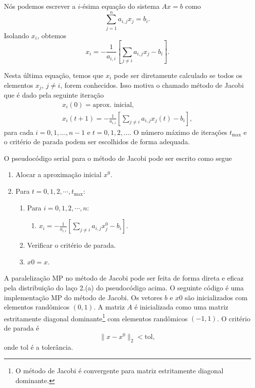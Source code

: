 Nós podemos escrever a $i$-ésima equação do sistema $Ax = b$ como
\begin{equation}
  \sum_{j=1}^n a_{i,j}x_j = b_i.
\end{equation}
Isolando $x_{i}$, obtemos
\begin{equation}\label{eq:mp_iterJacobi}
  x_i = -\frac{1}{a_{i,i}}\left[\sum_{j\neq i}a_{i,j}x_j - b_i\right].
\end{equation}

Nesta última equação, temos que $x_i$ pode ser diretamente calculado se todos os elementos $x_j$, $j\neq i$, forem conhecidos. Isso motiva o chamado método de Jacobi que é dado pela seguinte iteração
\begin{gather}
  x_i(0) = \text{aprox. inicial},\\
  x_i(t+1) = -\frac{1}{a_{i,i}}\left[\sum_{j\neq i}a_{i,j}x_j(t) - b_i\right],\label{eq:mp_jacobi_xi}
\end{gather}
para cada $i=0,1,\dotsc,n-1$ e $t=0,1,2,\ldots$. O número máximo de iterações $t_{\text{max}}$ e o critério de parada podem ser escolhidos de forma adequada.

O pseudocódigo serial para o método de Jacobi pode ser escrito como segue
\begin{enumerate}
\item Alocar a aproximação inicial $x^0$.
\item Para $t=0,1,2,\cdots,t_{\text{max}}$:
  \begin{enumerate}
  \item Para $i=0,1,2,\cdots,n$:
    \begin{enumerate}
    \item $\displaystyle x_i = -\frac{1}{a_{i,i}}\left[\sum_{j\neq i}a_{i,j}x^0_j - b_i\right]$.
    \end{enumerate}
  \item Verificar o critério de parada.
  \item $x0 = x$.
  \end{enumerate}
\end{enumerate}

A paralelização MP no método de Jacobi pode ser feita de forma direta e eficaz pela distribuição do laço 2.(a) do pseudocódigo acima. O seguinte código é uma implementação MP do método de Jacobi. Os vetores $b$ e $x0$ são inicializados com elementos randômicos $(0, 1)$. A matriz $A$ é inicializada como uma matriz estritamente diagonal dominante\footnote{O método de Jacobi é convergente para matriz estritamente diagonal dominante.} com elementos randômicos $(-1, 1)$. O critério de parada é
\begin{equation}
  \|x-x^0\|_2 < \text{tol},
\end{equation}
onde $\text{tol}$ é a tolerância.

